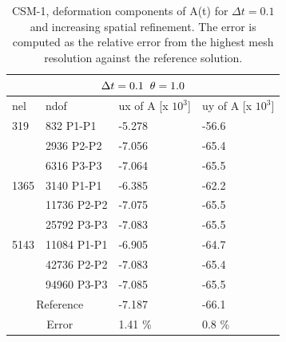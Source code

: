 \begin{table}[h!]
\centering
\label{CSM 1 Results}
\begin{tabular}{ |p{1cm}||p{2.7cm}|p{3.3cm}|p{3.3cm}|}
\hline
  \multicolumn{4}{|c|}{$\Delta t = 0.1 \hspace{2mm} \theta = 1.0$} \\
\hline
nel & ndof & ux of A [x $10^{3}$]  &uy of A [x $10^{3}$] \\
\hline
 319     & 832 P1-P1  & -5.278 &  -56.6 \\
     & 2936 P2-P2 & -7.056 &  -65.4 \\
      & 6316 P3-P3 &  -7.064 &   -65.5  \\
 \hline
  1365    & 3140 P1-P1  & -6.385 &  -62.2 \\
     & 11736 P2-P2 & -7.075 &  -65.5 \\
     & 25792 P3-P3 & -7.083 &  -65.5 \\
 \hline
  5143    & 11084 P1-P1 & -6.905 &  -64.7  \\
     & 42736 P2-P2 & -7.083 &  -65.4\\
     & 94960 P3-P3 & -7.085 &  -65.5  \\
  \hline
  \multicolumn{2}{|c|}{Reference}  &-7.187    & -66.1 \\
   \hline
    \multicolumn{2}{|c|}{Error}  & 1.41 \%   & 0.8 \%\\
   \hline
\end{tabular}
\caption{CSM-1, deformation components of A(t) for $\Delta t = 0.1$ and increasing spatial refinement. The error is computed as the relative error from the highest mesh resolution against the reference solution.}
\end{table}

